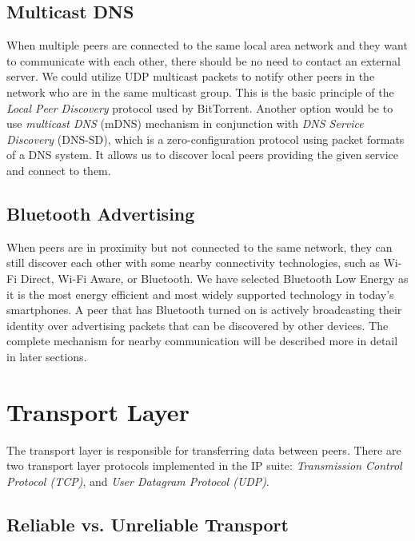 \subsection{Multicast DNS}

When multiple peers are connected to the same local area network and they want to communicate with each other, there should be no need to contact an external server. We could utilize UDP multicast packets to notify other peers in the network who are in the same multicast group. This is the basic principle of the \textit{Local Peer Discovery} protocol used by BitTorrent. Another option would be to use \textit{multicast DNS} (mDNS) mechanism in conjunction with \textit{DNS Service Discovery} (DNS-SD), which is a zero-configuration protocol using packet formats of a DNS system. It allows us to discover local peers providing the given service and connect to them.

\subsection{Bluetooth Advertising}

When peers are in proximity but not connected to the same network, they can still discover each other with some nearby connectivity technologies, such as Wi-Fi Direct, Wi-Fi Aware, or Bluetooth. We have selected Bluetooth Low Energy as it is the most energy efficient and most widely supported technology in today's smartphones. A peer that has Bluetooth turned on is actively broadcasting their identity over advertising packets that can be discovered by other devices. The complete mechanism for nearby communication will be described more in detail in later sections. %



\section{Transport Layer}

The transport layer is responsible for transferring data between peers. There are two transport layer protocols implemented in the IP suite: \textit{Transmission Control Protocol (TCP)}, and \textit{User Datagram Protocol (UDP)}.

\subsection{Reliable vs. Unreliable Transport}

